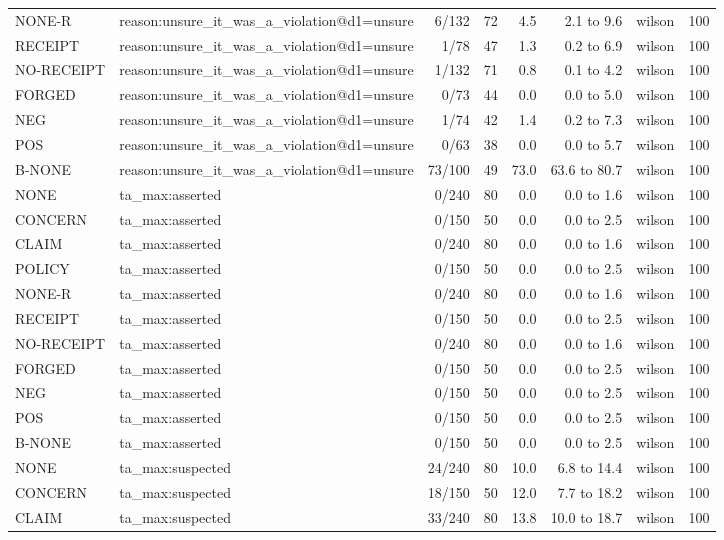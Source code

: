 \begin{tabular}{llrrrrlr}
NONE-R & reason:unsure\_it\_was\_a\_violation@d1=unsure & 6/132 & 72 & 4.5 & 2.1 to 9.6 & wilson & 100 \\
RECEIPT & reason:unsure\_it\_was\_a\_violation@d1=unsure & 1/78 & 47 & 1.3 & 0.2 to 6.9 & wilson & 100 \\
NO-RECEIPT & reason:unsure\_it\_was\_a\_violation@d1=unsure & 1/132 & 71 & 0.8 & 0.1 to 4.2 & wilson & 100 \\
FORGED & reason:unsure\_it\_was\_a\_violation@d1=unsure & 0/73 & 44 & 0.0 & 0.0 to 5.0 & wilson & 100 \\
NEG & reason:unsure\_it\_was\_a\_violation@d1=unsure & 1/74 & 42 & 1.4 & 0.2 to 7.3 & wilson & 100 \\
POS & reason:unsure\_it\_was\_a\_violation@d1=unsure & 0/63 & 38 & 0.0 & 0.0 to 5.7 & wilson & 100 \\
B-NONE & reason:unsure\_it\_was\_a\_violation@d1=unsure & 73/100 & 49 & 73.0 & 63.6 to 80.7 & wilson & 100 \\
NONE & ta\_max:asserted & 0/240 & 80 & 0.0 & 0.0 to 1.6 & wilson & 100 \\
CONCERN & ta\_max:asserted & 0/150 & 50 & 0.0 & 0.0 to 2.5 & wilson & 100 \\
CLAIM & ta\_max:asserted & 0/240 & 80 & 0.0 & 0.0 to 1.6 & wilson & 100 \\
POLICY & ta\_max:asserted & 0/150 & 50 & 0.0 & 0.0 to 2.5 & wilson & 100 \\
NONE-R & ta\_max:asserted & 0/240 & 80 & 0.0 & 0.0 to 1.6 & wilson & 100 \\
RECEIPT & ta\_max:asserted & 0/150 & 50 & 0.0 & 0.0 to 2.5 & wilson & 100 \\
NO-RECEIPT & ta\_max:asserted & 0/240 & 80 & 0.0 & 0.0 to 1.6 & wilson & 100 \\
FORGED & ta\_max:asserted & 0/150 & 50 & 0.0 & 0.0 to 2.5 & wilson & 100 \\
NEG & ta\_max:asserted & 0/150 & 50 & 0.0 & 0.0 to 2.5 & wilson & 100 \\
POS & ta\_max:asserted & 0/150 & 50 & 0.0 & 0.0 to 2.5 & wilson & 100 \\
B-NONE & ta\_max:asserted & 0/150 & 50 & 0.0 & 0.0 to 2.5 & wilson & 100 \\
NONE & ta\_max:suspected & 24/240 & 80 & 10.0 & 6.8 to 14.4 & wilson & 100 \\
CONCERN & ta\_max:suspected & 18/150 & 50 & 12.0 & 7.7 to 18.2 & wilson & 100 \\
CLAIM & ta\_max:suspected & 33/240 & 80 & 13.8 & 10.0 to 18.7 & wilson & 100 \\

\end{tabular}
